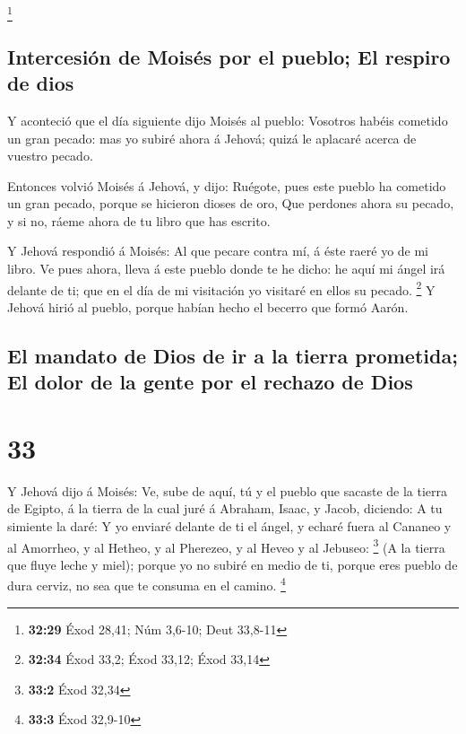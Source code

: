 \footnote{\textbf{32:29} Éxod 28,41; Núm 3,6-10; Deut 33,8-11}

\hypertarget{intercesiuxf3n-de-moisuxe9s-por-el-pueblo-el-respiro-de-dios}{%
\subsection{Intercesión de Moisés por el pueblo; El respiro de
dios}\label{intercesiuxf3n-de-moisuxe9s-por-el-pueblo-el-respiro-de-dios}}

 Y aconteció que el día siguiente dijo Moisés al pueblo:
Vosotros habéis cometido un gran pecado: mas yo subiré ahora á Jehová;
quizá le aplacaré acerca de vuestro pecado.

 Entonces volvió Moisés á Jehová, y dijo: Ruégote, pues
este pueblo ha cometido un gran pecado, porque se hicieron dioses de
oro,  Que perdones ahora su pecado, y si no, ráeme ahora
de tu libro que has escrito.

 Y Jehová respondió á Moisés: Al que pecare contra mí, á
éste raeré yo de mi libro.  Ve pues ahora, lleva á este
pueblo donde te he dicho: he aquí mi ángel irá delante de ti; que en el
día de mi visitación yo visitaré en ellos su pecado. \footnote{\textbf{32:34}
  Éxod 33,2; Éxod 33,12; Éxod 33,14}  Y Jehová hirió al
pueblo, porque habían hecho el becerro que formó Aarón.

\hypertarget{el-mandato-de-dios-de-ir-a-la-tierra-prometida-el-dolor-de-la-gente-por-el-rechazo-de-dios}{%
\subsection{El mandato de Dios de ir a la tierra prometida; El dolor de
la gente por el rechazo de
Dios}\label{el-mandato-de-dios-de-ir-a-la-tierra-prometida-el-dolor-de-la-gente-por-el-rechazo-de-dios}}

\hypertarget{section-32}{%
\section{33}\label{section-32}}

 Y Jehová dijo á Moisés: Ve, sube de aquí, tú y el pueblo
que sacaste de la tierra de Egipto, á la tierra de la cual juré á
Abraham, Isaac, y Jacob, diciendo: A tu simiente la daré: 
Y yo enviaré delante de ti el ángel, y echaré fuera al Cananeo y al
Amorrheo, y al Hetheo, y al Pherezeo, y al Heveo y al Jebuseo:
\footnote{\textbf{33:2} Éxod 32,34}  (A la tierra que
fluye leche y miel); porque yo no subiré en medio de ti, porque eres
pueblo de dura cerviz, no sea que te consuma en el camino. \footnote{\textbf{33:3}
  Éxod 32,9-10}

